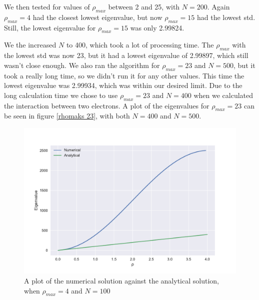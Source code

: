 \documentclass[a4paper]{article}
\begin{document}
We then tested for values of $\rho_{max}$ between 2 and 25, with $N=200$. Again $\rho_{max} = 4$ had the closest lowest eigenvalue, but now $\rho_{max} = 15$ had the lowest std. Still, the lowest eigenvalue for $\rho_{max} = 15$ was only 2.99824.

We the increased $N$ to 400, which took a lot of processing time. The $\rho_{max}$ with the lowest std was now 23, but it had a lowest eigenvalue of 2.99897, which still wasn't close enough. 
We also ran the algorithm for $\rho_{max}=23$ and $N=500$, but it took a really long time, so we didn't run it for any other values. This time the lowest eigenvalue was 2.99934, which was within our desired limit. Due to the long calculation time we chose to use $\rho_{max}=23$ and $N=400$ when we calculated the interaction between two electrons. A plot of the eigenvalues for $\rho_{max}=23$ can be seen in figure \ref{rhomaks 23}, with both $N=400$ and $N=500$.

\begin{figure}[h!]
\centering 
\includegraphics[scale=0.7]{../oppd_rho-4n-100.pdf}
\caption{A plot of the numerical solution against the analytical solution, when $\rho_{max}=4$ and $N=100$}
\label{rhomaks 4}
\end{figure}
\end{document}
